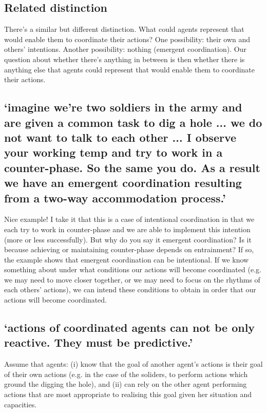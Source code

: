 \documentclass[12pt,\papersize]{extarticle}
\begin{document}
\subsection{Related distinction}
There's a similar but different distinction.  What could agents represent that would enable them to coordinate their actions?  One possibility: their own and others' intentions.  Another possibility: nothing (emergent coordination).  Our question about whether there's anything in between is then whether there is anything else that agents could represent that would enable them to coordinate their actions.


\subsection{`imagine we're two soldiers in the army and are given a common task to dig a hole ... we do not want to talk to each other ... I observe your working temp and try to work in a counter-phase. So the same you do. As a result we have an emergent coordination resulting from a two-way accommodation process.'}

Nice example!  I take it that this is a case of intentional coordination in that we each try to work in counter-phase and we are able to implement this intention (more or less successfully).  But why do you say it emergent coordination?  Is it because achieving or maintaining counter-phase depends on entrainment?  If so, the example shows that emergent coordination can be intentional.  If we know something about under what conditions our actions will become coordinated (e.g. we may need to move closer together, or we may need to focus on the rhythms of each others' actions), we can intend these conditions to obtain in order that our actions will become coordinated.


\subsection{`actions of coordinated agents can not be only reactive. They must be predictive.'}

Assume that agents: (i) know that the goal of another agent's actions is their goal of their own actions (e.g. in the case of the soliders, to perform actions which ground the digging the hole), and (ii) can rely on the other agent performing actions that are most appropriate to realising this goal given her situation and capacities.
\end{document}
